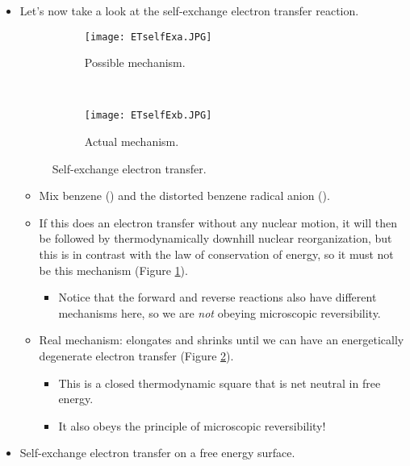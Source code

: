 \documentclass[../notes.tex]{subfiles}
\begin{document}
\begin{itemize}
    \item Let's now take a look at the self-exchange electron transfer reaction.
    \begin{figure}[H]
        \centering
        \begin{subfigure}[b]{\linewidth}
            \centering
            \texttt{[image: ETselfExa.JPG]}
            \caption{Possible mechanism.}
            \label{fig:ETselfExa}
        \end{subfigure}\\[2em]
        \begin{subfigure}[b]{\linewidth}
            \centering
            \texttt{[image: ETselfExb.JPG]}
            \caption{Actual mechanism.}
            \label{fig:ETselfExb}
        \end{subfigure}
        \caption{Self-exchange electron transfer.}
        \label{fig:ETselfEx}
    \end{figure}
    \begin{itemize}
        \item Mix benzene () and the distorted benzene radical anion ().
        \item If this does an electron transfer without any nuclear motion, it will then be followed by thermodynamically downhill nuclear reorganization, but this is in contrast with the law of conservation of energy, so it must not be this mechanism (Figure \ref{fig:ETselfExa}).
        \begin{itemize}
            \item Notice that the forward and reverse reactions also have different mechanisms here, so we are \emph{not} obeying microscopic reversibility.
        \end{itemize}
        \item Real mechanism:  elongates and  shrinks until we can have an energetically degenerate electron transfer (Figure \ref{fig:ETselfExb}).
        \begin{itemize}
            \item This is a closed thermodynamic square that is net neutral in free energy.
            \item It also obeys the principle of microscopic reversibility!
        \end{itemize}
    \end{itemize}
    \item Self-exchange electron transfer on a free energy surface.
    \begin{figure}[H]

\end{figure}
\end{itemize}
\end{document}
